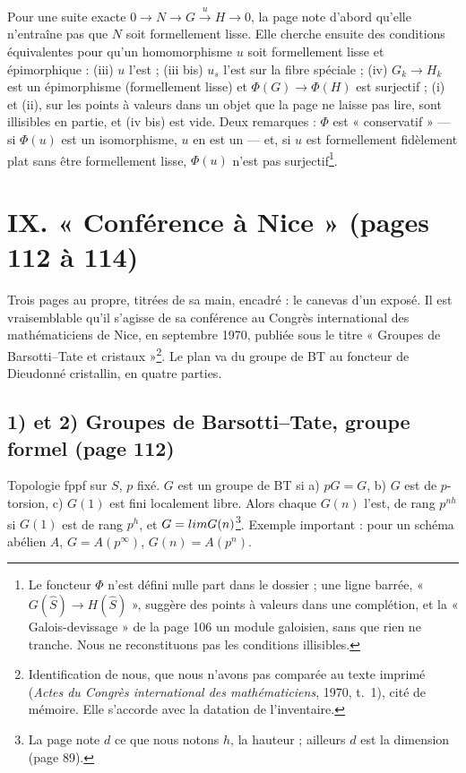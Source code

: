 \documentclass[11pt,a4paper]{article}
\begin{document}
Pour une suite exacte $0 \to N \to G \xrightarrow{u} H \to 0$, la page
note d'abord qu'elle n'entraîne pas que $N$ soit formellement lisse. Elle
cherche ensuite des conditions équivalentes pour qu'un homomorphisme $u$
soit formellement lisse et épimorphique : (iii) $u$ l'est ; (iii bis)
$u_s$ l'est sur la fibre spéciale ; (iv) $G_k \to H_k$ est un épimorphisme
(formellement lisse) et $\Phi(G) \to \Phi(H)$ est surjectif ; (i) et
(ii), sur les points à valeurs dans un objet que la page ne laisse pas
lire, sont illisibles en partie, et (iv bis) est vide. Deux remarques :
$\Phi$ est « conservatif » — si $\Phi(u)$ est un isomorphisme, $u$ en est
un — et, si $u$ est formellement fidèlement plat sans être formellement
lisse, $\Phi(u)$ n'est pas surjectif\footnote{Le foncteur $\Phi$ n'est
défini nulle part dans le dossier ; une ligne barrée,
« $G(\hat{S}) \to H(\hat{S})$ », suggère des points à valeurs dans une
complétion, et la « Galois-devissage » de la page 106 un module
galoisien, sans que rien ne tranche. Nous ne reconstituons pas les
conditions illisibles.}.

\section*{IX. « Conférence à Nice » (pages 112 à 114)}

Trois pages au propre, titrées de sa main, encadré : le canevas d'un
exposé. Il est vraisemblable qu'il s'agisse de sa conférence au Congrès
international des mathématiciens de Nice, en septembre 1970, publiée
sous le titre « Groupes de Barsotti–Tate et cristaux »\footnote{Identification
de nous, que nous n'avons pas comparée au texte imprimé (\emph{Actes du
Congrès international des mathématiciens}, 1970, t.~1), cité de
mémoire. Elle s'accorde avec la datation de l'inventaire.}. Le plan va du
groupe de BT au foncteur de Dieudonné cristallin, en quatre parties.

\subsection*{1) et 2) Groupes de Barsotti–Tate, groupe formel (page 112)}

Topologie fppf sur $S$, $p$ fixé. $G$ est un groupe de BT si a) $pG = G$,
b) $G$ est de $p$-torsion, c) $G(1)$ est fini localement libre. Alors
chaque $G(n)$ l'est, de rang $p^{nh}$ si $G(1)$ est de rang $p^{h}$, et
$G = \varinjlim G(n)$\footnote{La page note $d$ ce que nous notons $h$,
la hauteur ; ailleurs $d$ est la dimension (page 89).}. Exemple
important : pour un schéma abélien $A$, $G = A(p^{\infty})$,
$G(n) = A(p^{n})$.
\end{document}

